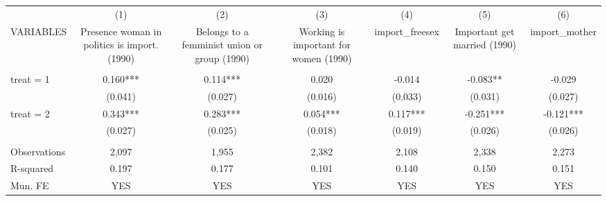 \begin{tabular}{lcccccc} \hline
 & (1) & (2) & (3) & (4) & (5) & (6) \\
VARIABLES & Presence woman in politics is import. (1990) & Belongs to a femminist union or group (1990) & Working is important for women (1990) & import\_freesex & Important get married (1990) & import\_mother \\ \hline
 &  &  &  &  &  &  \\
treat = 1 & 0.160*** & 0.114*** & 0.020 & -0.014 & -0.083** & -0.029 \\
 & (0.041) & (0.027) & (0.016) & (0.033) & (0.031) & (0.027) \\
treat = 2 & 0.343*** & 0.283*** & 0.054*** & 0.117*** & -0.251*** & -0.121*** \\
 & (0.027) & (0.025) & (0.018) & (0.019) & (0.026) & (0.026) \\
 &  &  &  &  &  &  \\
Observations & 2,097 & 1,955 & 2,382 & 2,108 & 2,338 & 2,273 \\
R-squared & 0.197 & 0.177 & 0.101 & 0.140 & 0.150 & 0.151 \\
 Mun. FE & YES & YES & YES & YES & YES & YES \\ \hline
\end{tabular}
